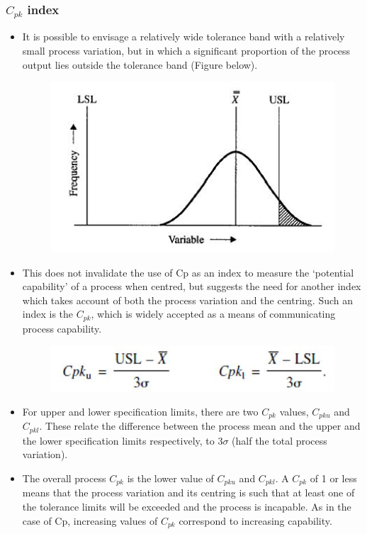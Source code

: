 \documentclass[MASTER-SPC.tex]{subfiles}
\begin{document}
\newpage	
	\subsubsection*{$C_{pk}$ index}
\begin{itemize}
\item It is possible to envisage a relatively wide tolerance band with a relatively
	small process variation, but in which a significant proportion of the process output lies outside the tolerance band (Figure below). 
	
	\begin{figure}[h!]
		\centering
		\includegraphics[width=0.7\linewidth]{proccapindices/image3}
	\end{figure}
	
\item This does not invalidate the use of Cp as an index to measure the ‘potential capability’ of a process when centred, but suggests the need for another index which takes account of both the process variation and the centring. Such an index is the $C_{pk}$, which is widely accepted as a means of communicating process capability.
	
	\begin{figure}[h!]
		\centering
		\includegraphics[width=0.7\linewidth]{proccapindices/image4}
	\end{figure}
	
\item 	For upper and lower specification limits, there are two $C_{pk}$ values,
	$C_{pku}$ and $C_{pkl}$. These relate the difference between the process mean and the upper and the lower specification limits respectively, to $3\sigma$ (half the total process variation).
	
\item	The overall process $C_{pk}$ is the lower value of $C_{pku}$ and $C_{pkl}$. A $C_{pk}$ of 1 or less means that the process variation and its centring is such that at least one of the tolerance limits will be exceeded and the process is incapable. As in the case of Cp, increasing values of $C_{pk}$ correspond to increasing capability. 
	

\end{itemize}
\end{document}
